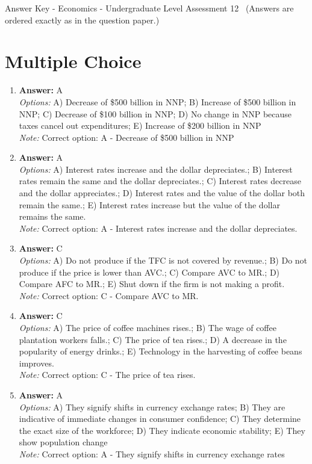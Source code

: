 \documentclass[12pt]{article}
\begin{document}
\begin{center}
Answer Key - Economics - Undergraduate Level Assessment 12 \
\small (Answers are ordered exactly as in the question paper.)
\end{center}

\section*{Multiple Choice}
\begin{enumerate}[label=\arabic*.]
\item \textbf{Answer:} A
\\ \textit{Options:} A) Decrease of \$500 billion in NNP; B) Increase of \$500 billion in NNP; C) Decrease of \$100 billion in NNP; D) No change in NNP because taxes cancel out expenditures; E) Increase of \$200 billion in NNP
\\ \textit{Note:} Correct option: A - Decrease of \$500 billion in NNP
\item \textbf{Answer:} A
\\ \textit{Options:} A) Interest rates increase and the dollar depreciates.; B) Interest rates remain the same and the dollar depreciates.; C) Interest rates decrease and the dollar appreciates.; D) Interest rates and the value of the dollar both remain the same.; E) Interest rates increase but the value of the dollar remains the same.
\\ \textit{Note:} Correct option: A - Interest rates increase and the dollar depreciates.
\item \textbf{Answer:} C
\\ \textit{Options:} A) Do not produce if the TFC is not covered by revenue.; B) Do not produce if the price is lower than AVC.; C) Compare AVC to MR.; D) Compare AFC to MR.; E) Shut down if the firm is not making a profit.
\\ \textit{Note:} Correct option: C - Compare AVC to MR.
\item \textbf{Answer:} C
\\ \textit{Options:} A) The price of coffee machines rises.; B) The wage of coffee plantation workers falls.; C) The price of tea rises.; D) A decrease in the popularity of energy drinks.; E) Technology in the harvesting of coffee beans improves.
\\ \textit{Note:} Correct option: C - The price of tea rises.
\item \textbf{Answer:} A
\\ \textit{Options:} A) They signify shifts in currency exchange rates; B) They are indicative of immediate changes in consumer confidence; C) They determine the exact size of the workforce; D) They indicate economic stability; E) They show population change
\\ \textit{Note:} Correct option: A - They signify shifts in currency exchange rates
\end{enumerate}
\end{document}
